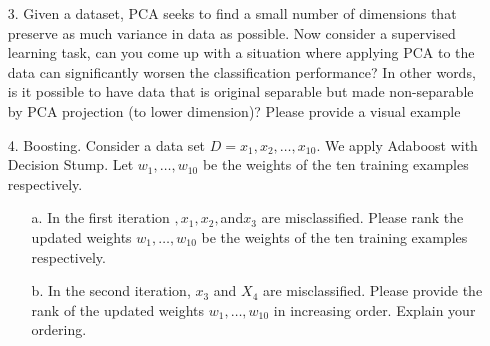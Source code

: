 \documentclass[12pt,letterpaper]{article}
\begin{document}
\begin{enumerate}
\begin{enumerate}
\begin{verbatim}
				  [x1, x2] = eig(V)
						   

				\end{verbatim} 
		\item[c.] Please plot the data in two difference figures, one in the original 2-d coordinate system, and one in the PCA space(2-d). \\
				

	\end{enumerate}
	\item[3.] Given a dataset, PCA seeks to find a small number of dimensions that preserve as much variance in data as possible. Now consider a supervised learning task, can you come up with a situation where applying PCA to the data can significantly worsen the classification performance? In other words, is it possible to have data that is original separable but made non-separable by PCA projection (to lower dimension)? Please provide a visual example \\
	\item[4.] Boosting. Consider a data set $D = {x_{1},x_{2},\ldots,x_{10}}$. We apply Adaboost with Decision Stump. Let $w_{1}, \ldots, w_{10}$ be the weights of the ten training examples respectively. \\
	\begin{enumerate}
		\item[a.] In the first iteration $, x_{1}, x_{2},$and$ x_{3}$ are misclassified. Please rank the updated weights $w_{1}, \ldots, w_{10}$ be the weights of the ten training examples respectively. \\
		\item[b.] In the second iteration, $x_{3}$ and $X_{4}$ are misclassified. Please provide the rank of the updated weights $w_{1}, \ldots, w_{10}$ in increasing order. Explain your ordering. \\
	\end{enumerate}
\end{enumerate}


 
\end{document}
